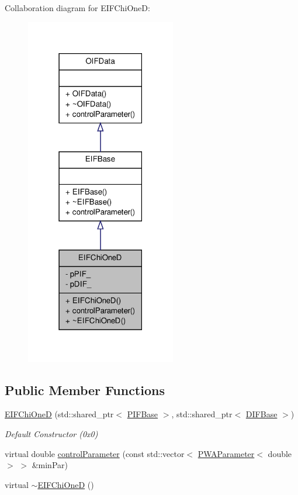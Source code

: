 Collaboration diagram for EIFChiOneD:\nopagebreak
\begin{figure}[H]
\begin{center}
\leavevmode
\includegraphics[width=186pt]{d2/db1/classEIFChiOneD__coll__graph}
\end{center}
\end{figure}
\subsection*{Public Member Functions}
\begin{DoxyCompactItemize}
\item 
\hyperlink{classEIFChiOneD_a777b712b06dd2c760f1071e2cc932eba}{EIFChiOneD} (std::shared\_\-ptr$<$ \hyperlink{classPIFBase}{PIFBase} $>$, std::shared\_\-ptr$<$ \hyperlink{classDIFBase}{DIFBase} $>$)
\begin{DoxyCompactList}\small\item\em Default Constructor (0x0) \end{DoxyCompactList}\item 
virtual double \hyperlink{classEIFChiOneD_a014a763220034f5547c2d395b3508b8d}{controlParameter} (const std::vector$<$ \hyperlink{classPWAParameter}{PWAParameter}$<$ double $>$ $>$ \&minPar)
\item 
virtual \hyperlink{classEIFChiOneD_ac826a3c3af84dd72fd96e32d597dd560}{$\sim$EIFChiOneD} ()
\end{DoxyCompactItemize}
